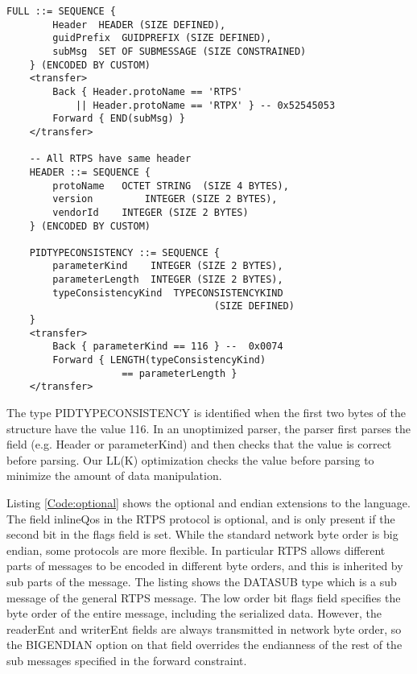 \documentclass[12pt,oneside,letterpaper]{article}
\begin{document}
\begin{lstlisting}[language=SCL2,style=mystyle,frame=none,float,
caption=Eample Back Constraints,label=Code:backConstraints, xleftmargin=3.5ex]
    FULL ::= SEQUENCE {
        Header  HEADER (SIZE DEFINED),
        guidPrefix  GUIDPREFIX (SIZE DEFINED),
        subMsg  SET OF SUBMESSAGE (SIZE CONSTRAINED)
    } (ENCODED BY CUSTOM)
    <transfer>
        Back { Header.protoName == 'RTPS'
            || Header.protoName == 'RTPX' } -- 0x52545053
        Forward { END(subMsg) }
    </transfer>

    -- All RTPS have same header
    HEADER ::= SEQUENCE {
        protoName   OCTET STRING  (SIZE 4 BYTES),
        version         INTEGER (SIZE 2 BYTES),
        vendorId    INTEGER (SIZE 2 BYTES)
    } (ENCODED BY CUSTOM)

    PIDTYPECONSISTENCY ::= SEQUENCE {
        parameterKind    INTEGER (SIZE 2 BYTES),
        parameterLength  INTEGER (SIZE 2 BYTES),
        typeConsistencyKind  TYPECONSISTENCYKIND
                                    (SIZE DEFINED)
    }
    <transfer>
        Back { parameterKind == 116 } --  0x0074
        Forward { LENGTH(typeConsistencyKind)
                    == parameterLength }
    </transfer>
\end{lstlisting}

The type PIDTYPECONSISTENCY is identified when the first two bytes of the structure have the value 116. In an unoptimized parser, the parser first parses the field (e.g. Header or parameterKind) and then checks that the value is correct before parsing. Our LL(K) optimization checks the value before parsing to minimize the amount of data manipulation.

Listing \ref{Code:optional} shows the optional and endian extensions to the language. The field inlineQos in the RTPS protocol is optional, and is only present if the second bit in the flags field is set. While the standard network byte order is big endian, some protocols are more flexible. In particular RTPS allows different parts of messages to be encoded in different byte orders, and this is inherited by sub parts of the message. The listing shows the DATASUB type which is a sub message of the general RTPS message. The low order bit flags field specifies the byte order of the entire message, including the serialized data. However, the readerEnt and writerEnt fields are always transmitted in network byte order, so the BIGENDIAN option on that field overrides the endianness of the rest of the sub messages specified in the forward constraint.
\end{document}
